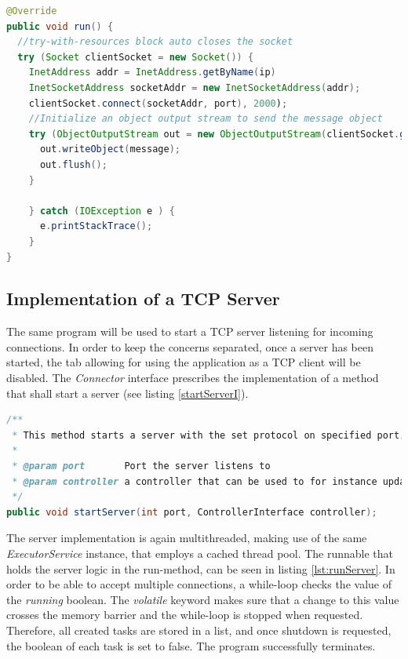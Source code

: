 \begin{minipage}{\linewidth}
	\begin{lstlisting}[language=Java, caption={TCP sendMessageTask implementation},captionpos=b,label=lst:TCPMessageTask]
@Override
public void run() {
  //try-with-resources block auto closes the socket
  try (Socket clientSocket = new Socket()) {
    InetAddress addr = InetAddress.getByName(ip)
    InetSocketAddress socketAddr = new InetSocketAddress(addr);
    clientSocket.connect(socketAddr, port), 2000);
    //Initialize an object output stream to send the message object
    try (ObjectOutputStream out = new ObjectOutputStream(clientSocket.getOutputStream())) {
      out.writeObject(message);
      out.flush();
    }
			
    } catch (IOException e ) {
      e.printStackTrace();
    }
}
	\end{lstlisting}
\end{minipage}

\subsection{Implementation of a TCP Server}

The same program will be used to start a TCP server listening for incoming connections. In order to keep the concerns separated, once a server has been started, the tab allowing for using the application as a TCP client will be disabled. The \textit{Connector} interface prescribes the implementation of a method that shall start a server (see listing \ref{startServerI}). 

\begin{lstlisting}[language=Java, caption={Interface prescribes a sendMessage method},captionpos=b,label=lst:startServerI]
/**
 * This method starts a server with the set protocol on specified port. The controller will be used to update the interface, especially with received messages.
 *
 * @param port       Port the server listens to
 * @param controller a controller that can be used to for instance update the GUI, display received messages
 */
public void startServer(int port, ControllerInterface controller);
\end{lstlisting}

The server implementation is again multithreaded, making use of the same \textit{ExecutorService} instance, that employs a cached thread pool. The runnable that holds the server logic in the run-method, can be seen in listing \ref{lst:runServer}. In order to be able to accept multiple connections, a while-loop checks the value of the \textit{running} boolean. The \textit{volatile} keyword makes sure that a change to this value crosses the memory barrier and the while-loop is stopped when requested. Therefore, all created tasks are stored in a list, and once shutdown is requested, the boolean of each task is set to false. The program successfully terminates.

